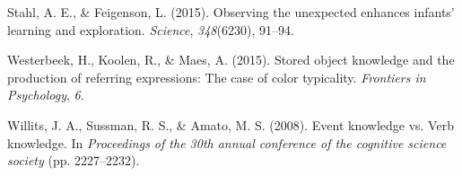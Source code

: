\documentclass[10pt, letterpaper]{article}
\begin{document}
\leavevmode\hypertarget{ref-stahl2015}{}%
Stahl, A. E., \& Feigenson, L. (2015). Observing the unexpected enhances
infants' learning and exploration. \emph{Science}, \emph{348}(6230),
91--94.

\leavevmode\hypertarget{ref-westerbeek2015}{}%
Westerbeek, H., Koolen, R., \& Maes, A. (2015). Stored object knowledge
and the production of referring expressions: The case of color
typicality. \emph{Frontiers in Psychology}, \emph{6}.

\leavevmode\hypertarget{ref-willits2008}{}%
Willits, J. A., Sussman, R. S., \& Amato, M. S. (2008). Event knowledge
vs. Verb knowledge. In \emph{Proceedings of the 30th annual conference
of the cognitive science society} (pp. 2227--2232).


\end{document}
